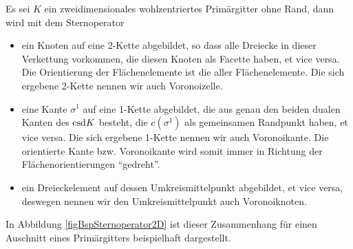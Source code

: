   \begin{bemerkung}
    Es sei \( K \) ein zweidimensionales wohlzentriertes Primärgitter ohne Rand,
    dann wird mit dem Sternoperator
    \begin{itemize}
      \item ein Knoten auf eine 2-Kette abgebildet, so dass alle Dreiecke in dieser Verkettung vorkommen, die diesen Knoten als Facette haben, et vice versa.
            Die Orientierung der Flächenelemente ist die aller Flächenelemente. Die sich ergebene 2-Kette nennen wir auch Voronoizelle.
      \item eine Kante \( \sigma^{1} \) auf eine 1-Kette abgebildet, die aus genau den beiden dualen Kanten des \( \text{csd} K \) besteht, die \( c(\sigma^{1}) \) als gemeinsamen Randpunkt
            haben, et vice versa.
            Die sich ergebene 1-Kette nennen wir auch Voronoikante. 
            Die orientierte Kante bzw. Voronoikante wird somit immer in Richtung der Flächenorientierungen "`gedreht"'.
      \item ein Dreieckelement auf dessen Umkreismittelpunkt abgebildet, et vice versa, deswegen nennen wir den Umkreismittelpunkt auch Voronoiknoten.
    \end{itemize}
    In Abbildung \ref{figBspSternoperator2D} ist dieser Zusammenhang für einen Auschnitt eines Primärgitters beispielhaft dargestellt.
  \end{bemerkung}

